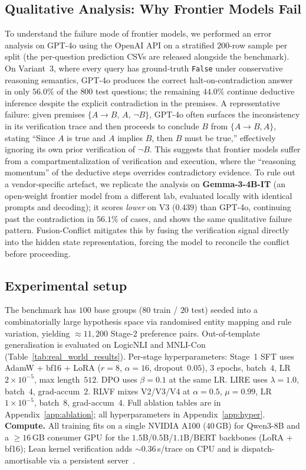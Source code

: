 \documentclass{article}
\begin{document}
\subsection{Qualitative Analysis: Why Frontier Models Fail}
To understand the failure mode of frontier models, we performed an error analysis on GPT-4o using the OpenAI API on a stratified $200$-row sample per split (the per-question prediction CSVs are released alongside the benchmark). On Variant~3, where every query has ground-truth \texttt{False} under conservative reasoning semantics, GPT-4o produces the correct halt-on-contradiction answer in only $56.0\%$ of the $800$ test questions; the remaining $44.0\%$ continue deductive inference despite the explicit contradiction in the premises. A representative failure: given premises $\{A \to B,\, A,\, \neg B\}$, GPT-4o often surfaces the inconsistency in its verification trace and then proceeds to conclude $B$ from $\{A \to B, A\}$, stating ``Since $A$ is true and $A$ implies $B$, then $B$ must be true,'' effectively ignoring its own prior verification of $\neg B$. This suggests that frontier models suffer from a compartmentalization of verification and execution, where the ``reasoning momentum'' of the deductive steps overrides contradictory evidence. To rule out a vendor-specific artefact, we replicate the analysis on \textbf{Gemma-3-4B-IT} (an open-weight frontier model from a different lab, evaluated locally with identical prompts and decoding); it scores \emph{lower} on V3 ($0.439$) than GPT-4o, continuing past the contradiction in $56.1\%$ of cases, and shows the same qualitative failure pattern. Fusion-Conflict mitigates this by fusing the verification signal directly into the hidden state representation, forcing the model to reconcile the conflict before proceeding.

\subsection{Experimental setup}
The benchmark has $100$ base groups ($80$ train / $20$ test) seeded into a combinatorially large hypothesis space via randomised entity mapping and rule variation, yielding $\approx\!11{,}200$ Stage-2 preference pairs. Out-of-template generalisation is evaluated on LogicNLI and MNLI-Con (Table~\ref{tab:real_world_results}). Per-stage hyperparameters: Stage~1 SFT uses AdamW + bf16 + LoRA ($r{=}8$, $\alpha{=}16$, dropout~$0.05$), $3$ epochs, batch~$4$, LR~$2{\times}10^{-5}$, max length~$512$. DPO uses $\beta{=}0.1$ at the same LR. LIRE uses $\lambda{=}1.0$, batch~$4$, grad-accum~$2$. RLVF mixes V2/V3/V4 at $\alpha{=}0.5$, $\mu{=}0.99$, LR $1{\times}10^{-5}$, batch~$8$, grad-accum~$4$. Full ablation tables are in Appendix~\ref{app:ablation}; all hyperparameters in Appendix~\ref{app:hyper}. \textbf{Compute.} All training fits on a single NVIDIA A100 ($40$\,GB) for Qwen3-8B and a $\geq 16$\,GB consumer GPU for the $1.5$B/$0.5$B/$1.1$B/BERT backbones (LoRA $+$ bf16); Lean kernel verification adds $\sim\!0.36$\,s/trace on CPU and is dispatch-amortisable via a persistent server~\citep{yang2023leandojo}.
\end{document}
